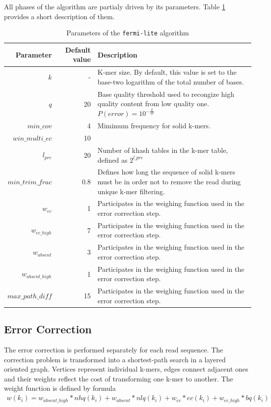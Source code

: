 All phases of the algorithm are partialy driven by its parameters. Table \ref{tab:fermi-parameters} provides a short description of them.

\begin{table}[h]
\begin{center}
\caption{Parameters of the \texttt{fermi-lite} algorithm}
\label{tab:fermi-parameters}
\begin{tabular}{| r | r | p{5cm} |}
\hline
Parameter & Default value & Description \\
\hline
$k$ & - & K-mer size. By default, this value is set to the base-two logarithm of the total number of bases. \\
\hline
$q$ & 20 & Base quality threshold used to recongize high quality content from low quality one. $P(error) = 10^{-\frac{q}{10}}$ \\
\hline
$min\_cov$ & 4 & Mimimum frequency for solid k-mers. \\
\hline
$win\_multi\_ec$ & 10 &  \\
\hline
$l_{pre}$ & 20 & Number of khash tables in the k-mer table, defined as $2^{l\_pre}$ \\
\hline
$min\_trim\_frac$ & 0.8 &  Defines how long the sequence of solid k-mers must be in order not to remove the read during unique k-mer filtering. \\
\hline
$w_{ec}$ & 1 & Participates in the weighing function used in the error correction step.\\
\hline
$w_{ec\_high}$ & 7 & Participates in the weighing function used in the error correction step. \\
\hline
$w_{absent}$ & 3 & Participates in the weighing function used in the error correction step. \\
\hline
$w_{absent\_high}$ & 1 & Participates in the weighing function used in the error correction step. \\ 
\hline
$max\_path\_diff$ & 15 & Participates in the weighing function used in the error correction step. \\ 
\hline
\end{tabular}
\end{center}
\end{table}

\subsection{Error Correction}
\label{subsec:fermi-error-correction}

The error correction is performed separately for each read sequence. The correction problem is transformed into a shortest-path search in a layered oriented graph. Vertices represent individual k-mers, edges connect adjacent ones and their weights reflect the cost of transforming one k-mer to another. The weight function is defined by formula
\begin{align*}
	w(k_i) = w_{absent\_high}*nhq(k_i) + w_{absent}*nlq(k_i) + w_{ec}*ec(k_i) + w_{ec\_high}*bq(k_i)
\end{align*}

